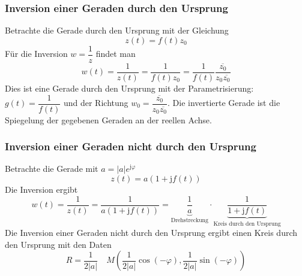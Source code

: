 \subsubsection{Inversion einer Geraden durch den Ursprung}
Betrachte die Gerade durch den Ursprung mit der Gleichung
\begin{equation}
\boxed{z\left(t\right)=f\left(t\right)z_0}
\end{equation} \tabularnewline
Für die Inversion $w=\dfrac{1}{z}$ findet man
\begin{equation}
\boxed{w\left(t\right)=\dfrac{1}{z\left(t\right)}=\dfrac{1}{f\left(t\right)z_0}=\dfrac{1}{f\left(t\right)}\dfrac{\overline{z_0}}{z_0\overline{z_0}}}
\end{equation}
Dies ist eine Gerade durch den Ursprung mit der Parametrisierung: $g\left(t\right)=\dfrac{1}{f\left(t\right)}$ und der Richtung $w_0=\dfrac{\overline{z_0}}{z_0\overline{z_0}}$. Die invertierte Gerade ist die Spiegelung der gegebenen Geraden an der reellen Achse.
\subsubsection{Inversion einer Geraden nicht durch den Ursprung}
Betrachte die Gerade mit $a=\Big\vert a\Big\vert e^{\text{j}\varphi}$
\begin{equation}
\boxed{z\left(t\right)=a\left(1+\text{j} f\left(t\right)\right)}
\end{equation}
Die Inversion ergibt
\begin{equation}
\boxed{w\left(t\right)=\dfrac{1}{z\left(t\right)}=\dfrac{1}{a\left(1+\text{j}f\left(t\right)\right)}=\underbrace{\dfrac{1}{a}}_{\text{Drehstreckung}}\cdot \underbrace{\dfrac{1}{1+\text{j}f\left(t\right)}}_{\text{Kreis durch den Ursprung}}}
\end{equation}
Die Inversion einer Geraden nicht durch den Ursprung ergibt einen Kreis durch den Ursprung mit den Daten
\begin{equation}
\boxed{R=\dfrac{1}{2\Big\vert a \Big\vert}}\quad \boxed{M\left(\dfrac{1}{2\Big\vert a\Big\vert}\cos\left(-\varphi\right), \dfrac{1}{2\Big\vert a\Big\vert}\sin\left(-\varphi\right)\right)}
\end{equation}
